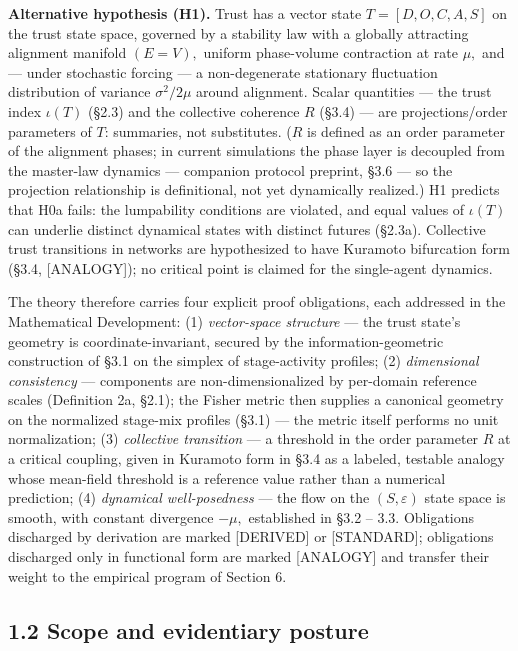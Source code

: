 \documentclass[
]{article}
\begin{document}
\textbf{Alternative hypothesis (H1).} Trust has a vector state
\(T = [D, O, C, A, S]\) on the trust state space, governed by a
stability law with a globally attracting alignment manifold \((E = V),\)
uniform phase-volume contraction at rate \(\mu,\) and --- under
stochastic forcing --- a non-degenerate stationary fluctuation
distribution of variance \(\sigma^{2}/2\mu\) around alignment. Scalar
quantities --- the trust index \(\iota(T)\) (§2.3) and the collective
coherence \(R\) (§3.4) --- are projections/order parameters of \(T\):
summaries, not substitutes. (\(R\) is defined as an order parameter of
the alignment phases; in current simulations the phase layer is
decoupled from the master-law dynamics --- companion protocol preprint,
§3.6 --- so the projection relationship is definitional, not yet
dynamically realized.) H1 predicts that H0a fails: the lumpability
conditions are violated, and equal values of \(\iota(T)\) can underlie
distinct dynamical states with distinct futures (§2.3a). Collective
trust transitions in networks are hypothesized to have Kuramoto
bifurcation form (§3.4, {[}ANALOGY{]}); no critical point is claimed for
the single-agent dynamics.

The theory therefore carries four explicit proof obligations, each
addressed in the Mathematical Development: (1) \emph{vector-space
structure} --- the trust state's geometry is coordinate-invariant,
secured by the information-geometric construction of §3.1 on the simplex
of stage-activity profiles; (2) \emph{dimensional consistency} ---
components are non-dimensionalized by per-domain reference scales
(Definition 2a, §2.1); the Fisher metric then supplies a canonical
geometry on the normalized stage-mix profiles (§3.1) --- the metric
itself performs no unit normalization; (3) \emph{collective transition}
--- a threshold in the order parameter \(R\) at a critical coupling,
given in Kuramoto form in §3.4 as a labeled, testable analogy whose
mean-field threshold is a reference value rather than a numerical
prediction; (4) \emph{dynamical well-posedness} --- the flow on the
\((S, \varepsilon)\) state space is smooth, with constant divergence
\(-\mu,\) established in §3.2 -- 3.3. Obligations discharged by
derivation are marked {[}DERIVED{]} or {[}STANDARD{]}; obligations
discharged only in functional form are marked {[}ANALOGY{]} and transfer
their weight to the empirical program of Section 6.

\subsection{1.2 Scope and evidentiary
posture}\label{scope-and-evidentiary-posture}
\end{document}
